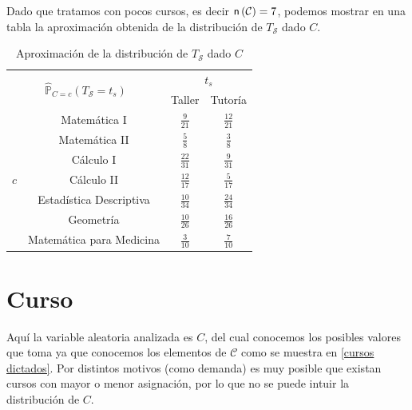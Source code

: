 \documentclass[11pt,a4paper]{book}
\theoremstyle{definition}%
\newcommand{\Probsymb}{\mathds{P}}
\newcommand{\card}[1]{\text{\textsf{n}}\left( #1 \right)}
\begin{document}
            Dado que tratamos con pocos cursos, es decir $\card{\mathcal{C}}=7$, podemos mostrar en una tabla la aproximación obtenida de la distribución de $T_\mathcal{S}$ dado $C$.
            \begin{table}[H]
                \centering
                \begin{tabular}{|c|c|c|c|}
                    \hline
                    \multicolumn{2}{|c|}{\multirow{2}{*}{$\hat{\Probsymb}_{C=c}(T_\mathcal{S}=t_s)$}} & \multicolumn{2}{c|}{$t_s$} \\ \cline{3-4}
                    \multicolumn{2}{|c|}{} & Taller & Tutoría \\ \hline
                    \multirow{7}{*}{$c$} & Matemática I & $\frac{9}{21}$ & $\frac{12}{21}$ \\ \cline{2-4}
                    & Matemática II & $\frac{5}{8}$ & $\frac{3}{8}$  \\ \cline{2-4}
                    & Cálculo I & $\frac{22}{31}$ & $\frac{9}{31}$  \\ \cline{2-4}
                    & Cálculo II & $\frac{12}{17}$ & $\frac{5}{17}$  \\ \cline{2-4}
                    & Estadística Descriptiva & $\frac{10}{34}$ & $\frac{24}{34}$  \\ \cline{2-4}
                    & Geometría & $\frac{10}{26}$ & $\frac{16}{26}$  \\ \cline{2-4}
                    & Matemática para Medicina & $\frac{3}{10}$ & $\frac{7}{10}$   \\ \hline
                \end{tabular}
                \caption{Aproximación de la distribución de $T_\mathcal{S}$ dado $C$}
                \label{tab:distribucion_Ts_C}
            \end{table}
        \section{Curso}
            Aquí la variable aleatoria analizada es $C$, del cual conocemos los posibles valores que toma ya que conocemos los elementos de $\mathcal{C}$ como se muestra en \ref{cursos dictados}. Por distintos motivos (como demanda) es muy posible que existan cursos con mayor o menor asignación, por lo que no se puede intuir la distribución de $C$.
            
\end{document}
